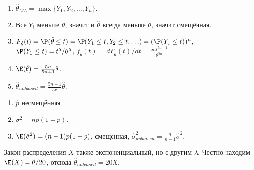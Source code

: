 \begin{solution}{19.3}
\begin{enumerate}
\item $\hat\theta_{ML} = \max\{ Y_1, Y_2, \ldots, Y_n\}$.
\item Все $Y_i$ меньше $\theta$, значит и $\hat\theta$ всегда меньше $\theta$, значит смещённая.
\item $F_{\hat\theta}(t) = \P(\hat\theta \leq t) = \P(Y_1 \leq t, Y_2 \leq t, \ldots) = (\P(Y_1 \leq t))^n$, $\P(Y_1 \leq t) = t^5/\theta^5$, $f_{\hat\theta}(t) = dF_{\hat\theta}(t)/dt = \frac{5n t^{5n-1}}{\theta^{5n}}$.
\item $\E(\hat\theta) = \frac{5n}{5n+1}\theta$.
\item $\hat\theta_{unbiased} = \frac{5n+1}{5n}\hat\theta$.
\end{enumerate}
\end{solution}
\begin{solution}{19.4}
\begin{enumerate}
  \item $\hat p$ несмещённая
  \item $\sigma^2 = n p(1-p)$.
  \item $\E(\hat\sigma^2) = (n-1)p(1-p)$, смещённая, $\hat\sigma^2_{unbiased} = \frac{n}{n-1} \hat\sigma^2$.
\end{enumerate}
\end{solution}
\begin{solution}{19.5}

\end{solution}
\begin{solution}{19.6}

\end{solution}
\begin{solution}{19.7}

\end{solution}
\begin{solution}{19.8}

\end{solution}
\begin{solution}{19.9}

\end{solution}
\begin{solution}{19.10}

\end{solution}
\begin{solution}{19.11}

\end{solution}
\begin{solution}{19.12}
  Закон распределения $X$ также экспоненциальный, но с другим $\lambda$. Честно находим $\E(X)=\theta/20$, отсюда
  $\hat\theta_{unbiased} = 20X$.
\end{solution}
